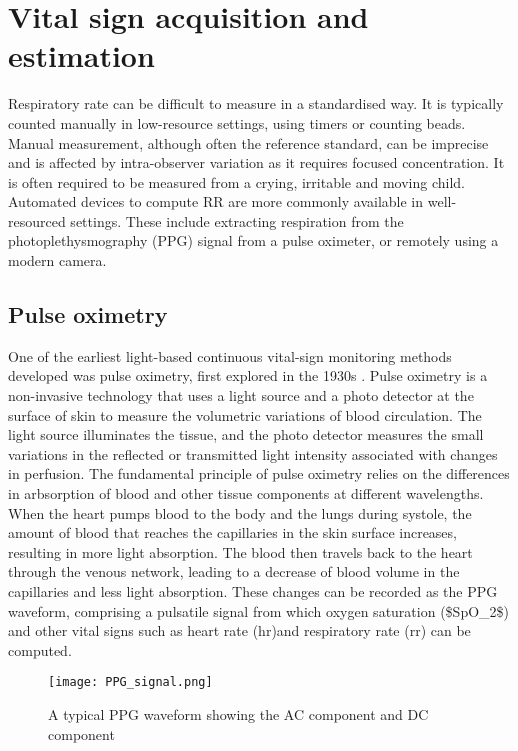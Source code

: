 \section{Vital sign acquisition and estimation}

Respiratory rate can be difficult to measure in a standardised way. It is typically counted manually in low-resource settings, using timers or counting beads. Manual measurement, although often the reference standard, can be imprecise and is affected by intra-observer variation as it requires focused concentration. It is often required to be measured from a crying, irritable and moving child. Automated devices to compute RR are more commonly available in well-resourced settings. These include extracting respiration from the photoplethysmography (PPG) signal from a pulse oximeter, or remotely using a modern camera.

\subsection{Pulse oximetry}

One of the earliest light-based continuous vital-sign monitoring methods developed was pulse oximetry, first explored in the 1930s \cite{elgendi2019use}. Pulse oximetry is a non-invasive technology that uses a light source and a photo detector at the surface of skin to measure the volumetric variations of blood circulation. 
The light source illuminates the tissue, and the photo detector measures the small variations in the reflected or transmitted light intensity associated with changes in perfusion. The fundamental principle of pulse oximetry relies on the differences in arbsorption of blood and other tissue components at different wavelengths\cite{ugnell1995time}.
When the heart pumps blood to the body and the lungs during systole, the amount of blood that reaches the capillaries in the skin surface increases, resulting in more light absorption. The blood then travels back to the heart through the venous network, leading to a decrease of blood volume in the capillaries and less light absorption\cite{sun2015photoplethysmography}. These changes can be recorded as the PPG waveform, comprising a pulsatile signal from which oxygen saturation (\gls{$SpO_2$}) and other vital signs such as heart rate (\gls{hr})and respiratory rate (\gls{rr}) can be computed.

\begin{figure}
  \centering
    \texttt{[image: PPG\_signal.png]}
    \caption[A typical PPG waveform]
    {
    A typical PPG waveform showing the AC component and DC component \cite{guo2015reflective}
    }    
    \label{ppgsignal}
\end{figure}


